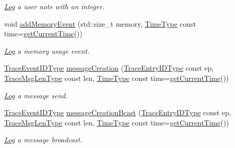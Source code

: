 \begin{DoxyCompactItemize}
\begin{DoxyCompactList}\small\item\em \hyperlink{structvt_1_1trace_1_1_log}{Log} a user note with an integer. \end{DoxyCompactList}\item 
void \hyperlink{structvt_1_1trace_1_1_trace_a8e8c848a48e05ff947b28606766bd658}{add\+Memory\+Event} (std\+::size\+\_\+t memory, \hyperlink{namespacevt_a2b9f28078dc309ad0706b69ded743e69}{Time\+Type} const time=\hyperlink{structvt_1_1trace_1_1_trace_lite_a5ddfc40d8206946d33630d4b81b6126c}{get\+Current\+Time}())
\begin{DoxyCompactList}\small\item\em \hyperlink{structvt_1_1trace_1_1_log}{Log} a memory usage event. \end{DoxyCompactList}\item 
\hyperlink{namespacevt_1_1trace_a64a7185f3e102df8d8258f263ccd1582}{Trace\+Event\+I\+D\+Type} \hyperlink{structvt_1_1trace_1_1_trace_a99d4161407df03e98a382987a4a44285}{message\+Creation} (\hyperlink{namespacevt_1_1trace_a3c14050715ba9eceaeff51fb3de64f2f}{Trace\+Entry\+I\+D\+Type} const ep, \hyperlink{namespacevt_1_1trace_aeb598f45d67d41db7902e494f2f0ce59}{Trace\+Msg\+Len\+Type} const len, \hyperlink{namespacevt_a2b9f28078dc309ad0706b69ded743e69}{Time\+Type} const time=\hyperlink{structvt_1_1trace_1_1_trace_lite_a5ddfc40d8206946d33630d4b81b6126c}{get\+Current\+Time}())
\begin{DoxyCompactList}\small\item\em \hyperlink{structvt_1_1trace_1_1_log}{Log} a message send. \end{DoxyCompactList}\item 
\hyperlink{namespacevt_1_1trace_a64a7185f3e102df8d8258f263ccd1582}{Trace\+Event\+I\+D\+Type} \hyperlink{structvt_1_1trace_1_1_trace_ab538fe805e9fd1842fae910c9db3e579}{message\+Creation\+Bcast} (\hyperlink{namespacevt_1_1trace_a3c14050715ba9eceaeff51fb3de64f2f}{Trace\+Entry\+I\+D\+Type} const ep, \hyperlink{namespacevt_1_1trace_aeb598f45d67d41db7902e494f2f0ce59}{Trace\+Msg\+Len\+Type} const len, \hyperlink{namespacevt_a2b9f28078dc309ad0706b69ded743e69}{Time\+Type} const time=\hyperlink{structvt_1_1trace_1_1_trace_lite_a5ddfc40d8206946d33630d4b81b6126c}{get\+Current\+Time}())
\begin{DoxyCompactList}\small\item\em \hyperlink{structvt_1_1trace_1_1_log}{Log} a message broadcast. \end{DoxyCompactList}\item 

\end{DoxyCompactItemize}
